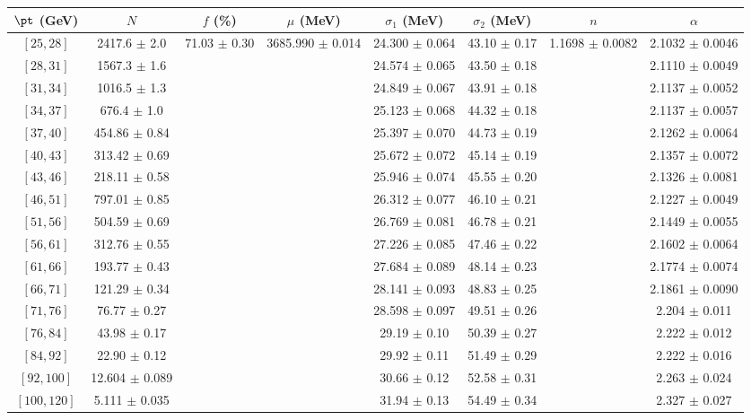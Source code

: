 \begin{tabular}{c||c|c|c|c|c|c|c}
$\pt$ (GeV) & $N$ & $f$ (\%) & $\mu$ (MeV) & $\sigma_1$ (MeV) & $\sigma_2$ (MeV) & $n$ & $\alpha$ \\
\hline
$[25, 28]$ & 2417.6 $\pm$ 2.0 & \multirow{17}{*}{71.03 $\pm$ 0.30} & \multirow{17}{*}{3685.990 $\pm$ 0.014} & 24.300 $\pm$ 0.064 & 43.10 $\pm$ 0.17 & \multirow{17}{*}{1.1698 $\pm$ 0.0082} & 2.1032 $\pm$ 0.0046\\
$[28, 31]$ & 1567.3 $\pm$ 1.6 &  &  & 24.574 $\pm$ 0.065 & 43.50 $\pm$ 0.18 &  & 2.1110 $\pm$ 0.0049\\
$[31, 34]$ & 1016.5 $\pm$ 1.3 &  &  & 24.849 $\pm$ 0.067 & 43.91 $\pm$ 0.18 &  & 2.1137 $\pm$ 0.0052\\
$[34, 37]$ & 676.4 $\pm$ 1.0 &  &  & 25.123 $\pm$ 0.068 & 44.32 $\pm$ 0.18 &  & 2.1137 $\pm$ 0.0057\\
$[37, 40]$ & 454.86 $\pm$ 0.84 &  &  & 25.397 $\pm$ 0.070 & 44.73 $\pm$ 0.19 &  & 2.1262 $\pm$ 0.0064\\
$[40, 43]$ & 313.42 $\pm$ 0.69 &  &  & 25.672 $\pm$ 0.072 & 45.14 $\pm$ 0.19 &  & 2.1357 $\pm$ 0.0072\\
$[43, 46]$ & 218.11 $\pm$ 0.58 &  &  & 25.946 $\pm$ 0.074 & 45.55 $\pm$ 0.20 &  & 2.1326 $\pm$ 0.0081\\
$[46, 51]$ & 797.01 $\pm$ 0.85 &  &  & 26.312 $\pm$ 0.077 & 46.10 $\pm$ 0.21 &  & 2.1227 $\pm$ 0.0049\\
$[51, 56]$ & 504.59 $\pm$ 0.69 &  &  & 26.769 $\pm$ 0.081 & 46.78 $\pm$ 0.21 &  & 2.1449 $\pm$ 0.0055\\
$[56, 61]$ & 312.76 $\pm$ 0.55 &  &  & 27.226 $\pm$ 0.085 & 47.46 $\pm$ 0.22 &  & 2.1602 $\pm$ 0.0064\\
$[61, 66]$ & 193.77 $\pm$ 0.43 &  &  & 27.684 $\pm$ 0.089 & 48.14 $\pm$ 0.23 &  & 2.1774 $\pm$ 0.0074\\
$[66, 71]$ & 121.29 $\pm$ 0.34 &  &  & 28.141 $\pm$ 0.093 & 48.83 $\pm$ 0.25 &  & 2.1861 $\pm$ 0.0090\\
$[71, 76]$ & 76.77 $\pm$ 0.27 &  &  & 28.598 $\pm$ 0.097 & 49.51 $\pm$ 0.26 &  & 2.204 $\pm$ 0.011\\
$[76, 84]$ & 43.98 $\pm$ 0.17 &  &  & 29.19 $\pm$ 0.10 & 50.39 $\pm$ 0.27 &  & 2.222 $\pm$ 0.012\\
$[84, 92]$ & 22.90 $\pm$ 0.12 &  &  & 29.92 $\pm$ 0.11 & 51.49 $\pm$ 0.29 &  & 2.222 $\pm$ 0.016\\
$[92, 100]$ & 12.604 $\pm$ 0.089 &  &  & 30.66 $\pm$ 0.12 & 52.58 $\pm$ 0.31 &  & 2.263 $\pm$ 0.024\\
$[100, 120]$ & 5.111 $\pm$ 0.035 &  &  & 31.94 $\pm$ 0.13 & 54.49 $\pm$ 0.34 &  & 2.327 $\pm$ 0.027\\
\end{tabular}
